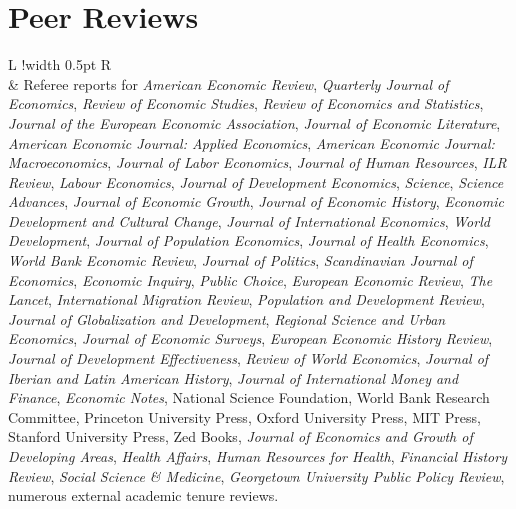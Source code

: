\documentclass[10pt]{article}
\newcommand\VRule{\color{lightgray}\vrule width 0.5pt}
\newcommand*{\helvetica}{\fontfamily{phv}\selectfont}
\begin{document}
\section{Peer Reviews} 
\begin{longtable}{L !{\VRule}  R}
	\endfirsthead
	\multicolumn{2}{l}{\helvetica \Large \hspace{-12pt} Peer Reviews, \textit{continued}} \\ [+3.5ex] 
	\endhead
	\phantom{xx} &
	 Referee reports for \textit{American Economic Review}, \textit{Quarterly Journal of Economics}, \textit{Review of Economic Studies}, \textit{Review of Economics and Statistics}, \textit{Journal of the European Economic Association}, \textit{Journal of Economic Literature}, \textit{American Economic Journal: Applied Economics}, \textit{American Economic Journal: Macroeconomics}, \textit{Journal of Labor Economics}, \textit{Journal of Human Resources}, \textit{ILR Review}, \textit{Labour Economics}, \textit{Journal of Development Economics}, \textit{Science}, \textit{Science Advances}, \textit{Journal of Economic Growth}, \textit{Journal of Economic History}, \textit{Economic Development and Cultural Change}, \textit{Journal of International Economics}, \textit{World Development}, \textit{Journal of Population Economics}, \textit{Journal of Health Economics}, \textit{World Bank Economic Review}, \textit{Journal of Politics}, \textit{Scandinavian Journal of Economics}, \textit{Economic Inquiry}, \textit{Public Choice}, \textit{European Economic Review}, \textit{The Lancet}, \textit{International Migration Review}, \textit{Population and Development Review}, \textit{Journal of Globalization and Development}, \textit{Regional Science and Urban Economics}, \textit{Journal of Economic Surveys}, \textit{European Economic History Review}, \textit{Journal of Development Effectiveness}, \textit{Review of World Economics}, \textit{Journal of Iberian and Latin American History}, \textit{Journal of International Money and Finance}, \textit{Economic Notes}, National Science Foundation, World Bank Research Committee, Princeton University Press, Oxford University Press, MIT Press, Stanford University Press, Zed Books, \textit{Journal of Economics and Growth of Developing Areas}, \textit{Health Affairs}, \textit{Human Resources for Health}, \textit{Financial History Review},  \textit{Social Science \& Medicine}, \textit{Georgetown University Public Policy Review}, numerous external academic tenure reviews.\\
\end{longtable}
\end{document}

